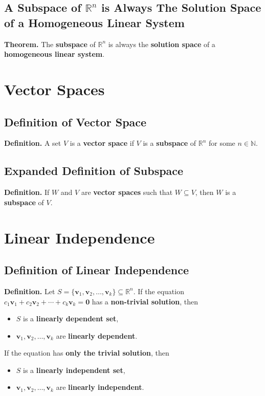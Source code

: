 \documentclass[../ma2001_notes.tex]{subfiles}
\begin{document}
\subsection{A Subspace of $\mathbb{R}^n$ is Always The Solution Space of a Homogeneous Linear System}
\textbf{Theorem.} The \textbf{subspace} of \(\mathbb{R}^n\) is always the \textbf{solution space} of a \textbf{homogeneous linear system}.

\section{Vector Spaces}
\subsection{Definition of Vector Space}
\textbf{Definition.} A set \(V\) is a \textbf{vector space} if \(V\) is a \textbf{subspace} of \(\mathbb{R}^n\) for some \(n\in\mathbb{N}\).

\subsection{Expanded Definition of Subspace}
\textbf{Definition.} If \(W\) and \(V\) are \textbf{vector spaces} such that \(W\subseteq V\), then \(W\) is a \textbf{subspace} of \(V\).

\section{Linear Independence}
\subsection{Definition of Linear Independence}
\textbf{Definition.} Let \(S=\{\bm{v}_1,\bm{v}_2,\ldots,\bm{v}_k\}\subseteq\mathbb{R}^n\). If the equation \(c_1\bm{v}_1+c_2\bm{v}_2+\cdots+c_k\bm{v}_k=\bm{0}\) has a \textbf{non-trivial solution}, then
\begin{itemize}
	\item\(S\) is a \textbf{linearly dependent set},
	\item\(\bm{v}_1,\bm{v}_2,\ldots,\bm{v}_k\) are \textbf{linearly dependent}.
\end{itemize}
If the equation has \textbf{only the trivial solution}, then
\begin{itemize}
	\item\(S\) is a \textbf{linearly independent set},
	\item\(\bm{v}_1,\bm{v}_2,\ldots,\bm{v}_k\) are \textbf{linearly independent}.
\end{itemize}
\end{document}
